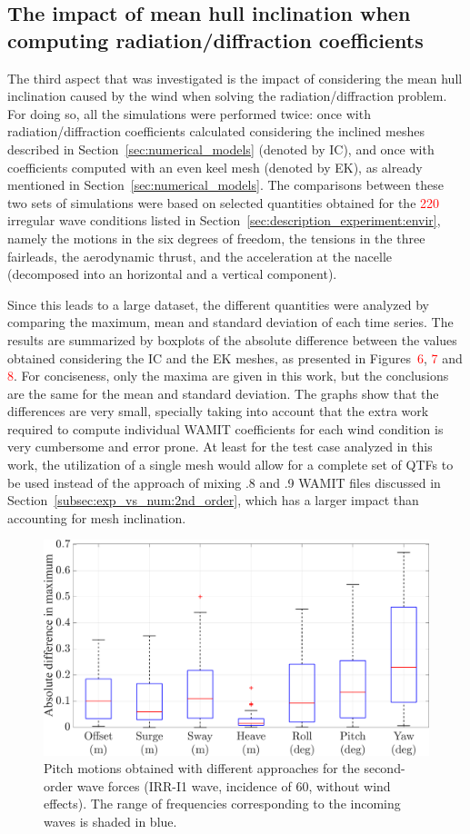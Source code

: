 \subsection{The impact of mean hull inclination when computing radiation/diffraction coefficients} \label{subsec:exp_vs_num:impact_inclination}
The third aspect that was investigated is the impact of considering the mean hull inclination caused by the wind when solving the radiation/diffraction problem. For doing so, all the simulations were performed twice: once with radiation/diffraction coefficients calculated considering the inclined meshes described in Section~\ref{sec:numerical_models} (denoted by IC), and once with coefficients computed with an even keel mesh (denoted by EK), as already mentioned in Section~\ref{sec:numerical_models}. The comparisons between these two sets of simulations were based on selected quantities obtained for the \textcolor{red}{220} irregular wave conditions listed in Section~\ref{sec:description_experiment:envir}, namely the motions in the six degrees of freedom, the tensions in the three fairleads, the aerodynamic thrust, and the acceleration at the nacelle (decomposed into an horizontal and a vertical component). 

Since this leads to a large dataset, the different quantities were analyzed by comparing the maximum, mean and standard deviation of each time series. The results are summarized by boxplots of the absolute difference between the values obtained considering the IC and the EK meshes, as presented in Figures~\textcolor{red}{6}, \textcolor{red}{7} and \textcolor{red}{8}. For conciseness, only the maxima are given in this work, but the conclusions are the same for the mean and standard deviation. The graphs show that the differences are very small, specially taking into account that the extra work required to compute individual WAMIT coefficients for each wind condition is very cumbersome and error prone. At least for the test case analyzed in this work, the utilization of a single mesh would allow for a complete set of QTFs to be used instead of the approach of mixing .8 and .9 WAMIT files discussed in Section~\ref{subsec:exp_vs_num:2nd_order}, which has a larger impact than accounting for mesh inclination.

\begin{figure}[!hbtp]
	\centering
	\includegraphics[width=0.5\columnwidth]{./figures/ek_vs_ic-motions}	
	\caption{Pitch motions obtained with different approaches for the second-order wave forces (IRR-I1 wave, incidence of 60\textdegree{}, without wind effects). The range of frequencies corresponding to the incoming waves is shaded in blue.} \label{fig:exp_vs_num:impact_inclination:boxplot-motions}%
\end{figure}%

